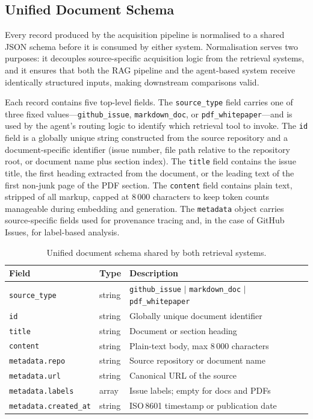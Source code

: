 \subsection{Unified Document Schema}

Every record produced by the acquisition pipeline is normalised to a shared JSON schema before it is consumed by either system. Normalisation serves two purposes: it decouples source-specific acquisition logic from the retrieval systems, and it ensures that both the RAG pipeline and the agent-based system receive identically structured inputs, making downstream comparisons valid.

Each record contains five top-level fields. The \texttt{source\_type} field carries one of three fixed values—\texttt{github\_issue}, \texttt{markdown\_doc}, or \texttt{pdf\_whitepaper}—and is used by the agent's routing logic to identify which retrieval tool to invoke. The \texttt{id} field is a globally unique string constructed from the source repository and a document-specific identifier (issue number, file path relative to the repository root, or document name plus section index). The \texttt{title} field contains the issue title, the first heading extracted from the document, or the leading text of the first non-junk page of the PDF section. The \texttt{content} field contains plain text, stripped of all markup, capped at 8\,000 characters to keep token counts manageable during embedding and generation. The \texttt{metadata} object carries source-specific fields used for provenance tracing and, in the case of GitHub Issues, for label-based analysis.

\begin{table}[ht]
\centering
\small
\setlength{\tabcolsep}{4pt}
\caption{Unified document schema shared by both retrieval systems.}
\label{tab:schema}
\begin{tabular}{p{4.6cm}p{1.3cm}p{7.7cm}}
\hline
\textbf{Field} & \textbf{Type} & \textbf{Description} \\
\hline
\texttt{source\_type}         & string  & \texttt{github\_issue} $|$ \texttt{markdown\_doc} $|$ \texttt{pdf\_whitepaper} \\
\texttt{id}                   & string  & Globally unique document identifier \\
\texttt{title}                & string  & Document or section heading \\
\texttt{content}              & string  & Plain-text body, max 8\,000 characters \\
\texttt{metadata.repo}        & string  & Source repository or document name \\
\texttt{metadata.url}         & string  & Canonical URL of the source \\
\texttt{metadata.labels}      & array   & Issue labels; empty for docs and PDFs \\
\texttt{metadata.created\_at} & string  & ISO\,8601 timestamp or publication date \\
\hline
\end{tabular}
\end{table}

